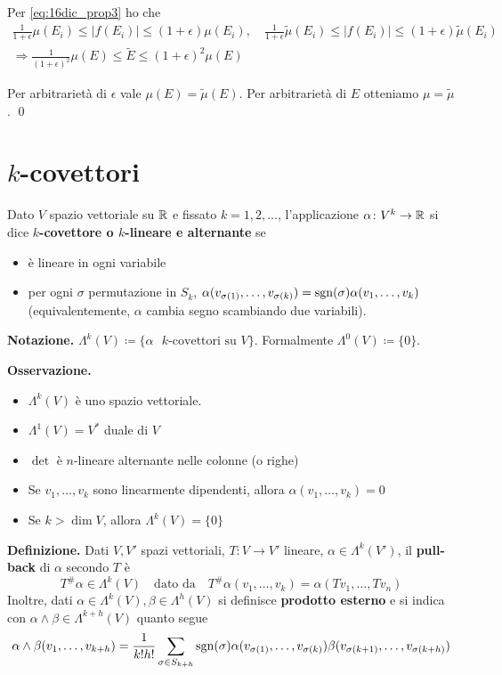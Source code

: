 Per \eqref{eq:16dic_prop3} ho che
%
\begin{gather*}
	\frac{1}{1+\epsilon} \mu(E_i) \leq |f(E_i)| \leq (1+\epsilon) \mu(E_i), \quad 
	\frac{1}{1+\epsilon} \tilde{\mu}(E_i) \leq |f(E_i)| \leq (1+\epsilon) \tilde{\mu}(E_i) \\
	\Longrightarrow \frac{1}{(1+\epsilon)^2} \mu(E) \leq \tilde{E} \leq (1+\epsilon)^2 \mu(E)
\end{gather*}

Per arbitrarietà di $\epsilon$ vale $\mu(E) = \tilde{\mu}(E)$. Per arbitrarietà di $E$ otteniamo $\mu = \tilde{\mu}$.
\qed


\section{$k$-covettori}

Dato $V$ spazio vettoriale su $\mathbb R$ e fissato $k=1,2,\ldots$, l'applicazione $\alpha \colon  V^k \to \mathbb R$ si dice \textbf{$k$-covettore o $k$-lineare e alternante} se
\begin{itemize}

	\item è lineare in ogni variabile

	\item per ogni $\sigma$ permutazione in $S_k$, $\alpha(v_{\sigma(1)},\ldots,v_{\sigma(k)}) = \operatorname{sgn}(\sigma) \alpha(v_1,\ldots,v_k)$ (equivalentemente, $\alpha$ cambia segno scambiando due variabili).

\end{itemize}

\textbf{Notazione.} $\Lambda^k (V) \coloneqq  \{\alpha \text{ $k$-covettori su } V \}$. Formalmente $\Lambda^0(V) \coloneqq \{0\}$.

\textbf{Osservazione.} 
\begin{itemize}

	\item $\Lambda^k(V)$ è uno spazio vettoriale. 

	\item $\Lambda^1(V) = V^*$ duale di $V$

	\item $\det$ è $n$-lineare alternante nelle colonne (o righe)

	\item Se $v_1,\ldots,v_k$ sono linearmente dipendenti, allora $\alpha(v_1,\ldots,v_k) = 0$

	\item Se $k > \dim V$, allora $\Lambda^k(V) = \{0\}$

\end{itemize}

\textbf{Definizione.} Dati $V,V'$ spazi vettoriali, $T \colon V \to V'$ lineare, $\alpha \in \Lambda^k (V')$, il \textbf{pull-back} di $\alpha$ secondo $T$ è
%
$$
T^\# \alpha \in \Lambda^k(V) \quad \text{dato da} \quad T^\# \alpha(v_1,\ldots,v_k) = \alpha(Tv_1,\ldots,Tv_n)
$$
%
Inoltre, dati $\alpha \in \Lambda^k(V), \beta \in \Lambda^h(V)$ si definisce \textbf{prodotto esterno} e si indica con $\alpha \wedge \beta \in \Lambda^{k+h}(V)$ quanto segue
%
$$
	\alpha \wedge \beta (v_1,\ldots,v_{k+h}) = \frac{1}{k!h!} \sum_{\sigma \in S_{k+h}} \operatorname{sgn} (\sigma) \alpha(v_{\sigma(1)},\ldots,v_{\sigma(k)}) \beta(v_{\sigma(k+1)},\ldots,v_{\sigma(k+h)})
$$
%

